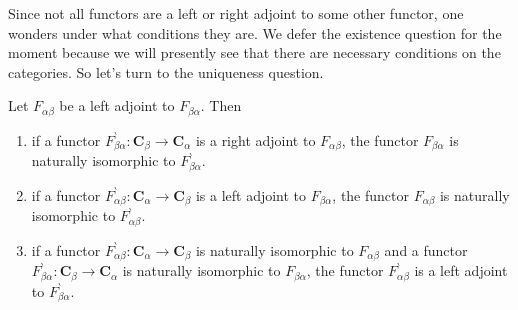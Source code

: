Since not all functors are a left or right adjoint to some other functor, one wonders under what conditions they are.
We defer the existence question for the moment because we will presently see that there are necessary conditions on the categories.
So let's turn to the uniqueness question.
\\
\begin{thm}
\label{thm:adjointuniq}
Let $F_{\alpha\beta}$ be a left adjoint to $F_{\beta\alpha}$.
Then
\begin{enumerate}
\item[(a)]
if a functor $F_{\beta\alpha}^{\backprime} \colon \mathbf{C}_{\beta} \rightarrow \mathbf{C}_{\alpha}$ is a right adjoint to $F_{\alpha\beta}$, the functor $F_{\beta\alpha}$ is naturally isomorphic to $F_{\beta\alpha}^{\backprime}$.
\item[(b)]
if a functor $F_{\alpha\beta}^{\backprime} \colon \mathbf{C}_{\alpha} \rightarrow \mathbf{C}_{\beta}$ is a left adjoint to $F_{\beta\alpha}$, the functor $F_{\alpha\beta}$ is naturally isomorphic to $F_{\alpha\beta}^{\backprime}$.
\item[(c)]
if a functor $F_{\alpha\beta}^{\backprime} \colon \mathbf{C}_{\alpha} \rightarrow \mathbf{C}_{\beta}$ is naturally isomorphic to $F_{\alpha\beta}$ and a functor $F_{\beta\alpha}^{\backprime} \colon \mathbf{C}_{\beta} \rightarrow \mathbf{C}_{\alpha}$ is naturally isomorphic to $F_{\beta\alpha}$, the functor $F_{\alpha\beta}^{\backprime}$ is a left adjoint to $F_{\beta\alpha}^{\backprime}$.
\end{enumerate}
\end{thm}
